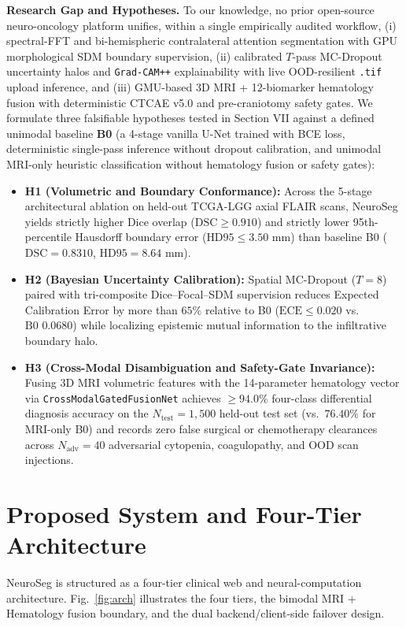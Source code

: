 \documentclass[journal,onecolumn,10pt]{IEEEtran}
\begin{document}
\textbf{Research Gap and Hypotheses.} To our knowledge, no prior open-source neuro-oncology platform unifies, within a single empirically audited workflow, (i) spectral-FFT and bi-hemispheric contralateral attention segmentation with GPU morphological SDM boundary supervision, (ii) calibrated $T$-pass MC-Dropout uncertainty halos and \texttt{Grad-CAM++} explainability with live OOD-resilient \texttt{.tif} upload inference, and (iii) GMU-based 3D MRI + 12-biomarker hematology fusion with deterministic CTCAE v5.0 and pre-craniotomy safety gates. We formulate three falsifiable hypotheses tested in Section VII against a defined unimodal baseline \textbf{B0} (a 4-stage vanilla U-Net trained with BCE loss, deterministic single-pass inference without dropout calibration, and unimodal MRI-only heuristic classification without hematology fusion or safety gates):
\begin{itemize}
    \item \textbf{H1 (Volumetric and Boundary Conformance):} Across the 5-stage architectural ablation on held-out TCGA-LGG axial FLAIR scans, NeuroSeg yields strictly higher Dice overlap ($\text{DSC} \ge 0.910$) and strictly lower 95th-percentile Hausdorff boundary error ($\text{HD95} \le 3.50\text{ mm}$) than baseline B0 ($\text{DSC} = 0.8310$, $\text{HD95} = 8.64\text{ mm}$).
    \item \textbf{H2 (Bayesian Uncertainty Calibration):} Spatial MC-Dropout ($T = 8$) paired with tri-composite Dice--Focal--SDM supervision reduces Expected Calibration Error by more than $65\%$ relative to B0 ($\text{ECE} \le 0.020$ vs.\ $\text{B0 } 0.0680$) while localizing epistemic mutual information to the infiltrative boundary halo.
    \item \textbf{H3 (Cross-Modal Disambiguation and Safety-Gate Invariance):} Fusing 3D MRI volumetric features with the 14-parameter hematology vector via \texttt{CrossModalGatedFusionNet} achieves $\ge 94.0\%$ four-class differential diagnosis accuracy on the $N_{\text{test}} = 1,500$ held-out test set (vs.\ $76.40\%$ for MRI-only B0) and records zero false surgical or chemotherapy clearances across $N_{\text{adv}} = 40$ adversarial cytopenia, coagulopathy, and OOD scan injections.
\end{itemize}

\section{Proposed System and Four-Tier Architecture}
NeuroSeg is structured as a four-tier clinical web and neural-computation architecture. Fig.~\ref{fig:arch} illustrates the four tiers, the bimodal MRI + Hematology fusion boundary, and the dual backend/client-side failover design.
\end{document}
